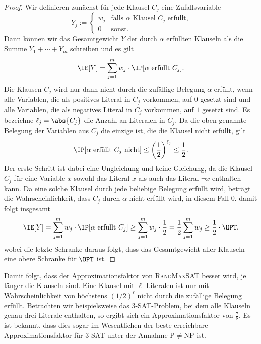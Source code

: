 \documentclass[language=ngerman,algolist]{TemplateLecture}
\begin{document}
\begin{proof}
    Wir definieren zunächst für jede Klausel $C_j$ eine Zufallsvariable
    \begin{equation*}
        Y_j := \begin{cases}
            w_j & \text{falls $\alpha$ Klausel $C_j$ erfüllt,} \\
            0 & \text{sonst.}
        \end{cases}
    \end{equation*}
    Dann können wir das Gesamtgewicht $Y$ der durch $\alpha$ erfüllten Klauseln als die Summe $Y_1 + \cdots + Y_m$ schreiben und es gilt 
    \begin{equation*}
        \IE[Y] = \sum_{j = 1}^m w_j \cdot \IP[\text{$\alpha$ erfüllt $C_j$}].
    \end{equation*}
    Die Klausen $C_j$ wird nur dann nicht durch die zufällige Belegung $\alpha$ erfüllt, wenn alle Variablen, die als positives Literal in $C_j$ vorkommen, auf $0$ gesetzt sind und alle Variablen, die als negatives Literal in $C_j$ vorkommen, auf $1$ gesetzt sind. Es bezeichne $\ell_j = \abs{C_j}$ die Anzahl an Literalen in $C_j$. Da die oben genannte Belegung der Variablen aus $C_j$ die einzige ist, die die Klausel nicht erfüllt, gilt 
    \begin{equation*}
        \IP[\text{$\alpha$ erfüllt $C_j$ nicht}] \leq \left( \frac{1}{2} \right)^{\ell_j} \leq \frac{1}{2}.
    \end{equation*}
    Der erste Schritt ist dabei eine Ungleichung und keine Gleichung, da die Klausel $C_j$ für eine Variable $x$ sowohl das Literal $x$ als auch das Literal $\neg x$ enthalten kann. Da eine solche Klausel durch jede beliebige Belegung erfüllt wird, beträgt die Wahrscheinlichkeit, dass $C_j$ durch $\alpha$ nicht erfüllt wird, in diesem Fall $0$. damit folgt insgesamt 
    \begin{equation*}
        \IE[Y] = \sum_{j = 1}^m w_j \cdot \IP[\text{$\alpha$ erfüllt $C_j$}] \geq \sum_{j = 1}^m w_j \cdot \frac{1}{2} = \frac{1}{2} \sum_{j = 1}^m w_j \geq \frac{1}{2} \cdot \OPT,
    \end{equation*}
    wobei die letzte Schranke daraus folgt, dass das Gesamtgewicht aller Klauseln eine obere Schranke für $\OPT$ ist.
\end{proof}

Damit folgt, dass der Approximationsfaktor von \textsc{RandMaxSAT} besser wird, je länger die Klauseln sind. Eine Klausel mit $\ell$ Literalen ist nur mit Wahrscheinlichkeit von höchstens $(1/2)^\ell$ nicht durch die zufällige Belegung erfüllt. Betrachten wir beispielsweise das $3$-SAT-Problem, bei dem alle Klauseln genau drei Literale enthalten, so ergibt sich ein Approximationsfaktor von $\frac{7}{8}$. Es ist bekannt, dass dies sogar im Wesentlichen der beste erreichbare Approximationsfaktor für $3$-SAT unter der Annahme P$\neq$NP ist.
\end{document}
